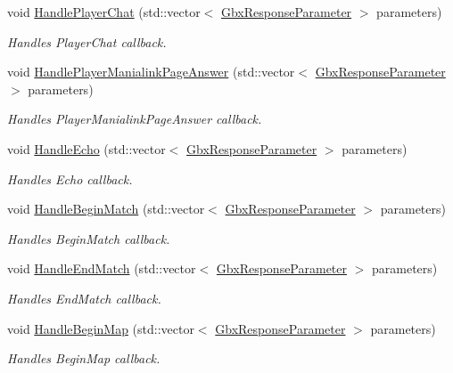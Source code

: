 \begin{DoxyCompactItemize}
void \hyperlink{classCallBackManager_a0919197cbeeb3c5a12230d44109a2cdb}{Handle\-Player\-Chat} (std\-::vector$<$ \hyperlink{classGbxResponseParameter}{Gbx\-Response\-Parameter} $>$ parameters)
\begin{DoxyCompactList}\small\item\em Handles Player\-Chat callback. \end{DoxyCompactList}\item 
void \hyperlink{classCallBackManager_af4fcbb46d5e88bfdf34185b1d0c7d836}{Handle\-Player\-Manialink\-Page\-Answer} (std\-::vector$<$ \hyperlink{classGbxResponseParameter}{Gbx\-Response\-Parameter} $>$ parameters)
\begin{DoxyCompactList}\small\item\em Handles Player\-Manialink\-Page\-Answer callback. \end{DoxyCompactList}\item 
void \hyperlink{classCallBackManager_a75f7f6d423799a89d9988b23a22bed18}{Handle\-Echo} (std\-::vector$<$ \hyperlink{classGbxResponseParameter}{Gbx\-Response\-Parameter} $>$ parameters)
\begin{DoxyCompactList}\small\item\em Handles Echo callback. \end{DoxyCompactList}\item 
void \hyperlink{classCallBackManager_ad741782611d10c7a67e6d1a8630cc605}{Handle\-Begin\-Match} (std\-::vector$<$ \hyperlink{classGbxResponseParameter}{Gbx\-Response\-Parameter} $>$ parameters)
\begin{DoxyCompactList}\small\item\em Handles Begin\-Match callback. \end{DoxyCompactList}\item 
void \hyperlink{classCallBackManager_a1084f327bacd054c1a8204e3f5e90ccb}{Handle\-End\-Match} (std\-::vector$<$ \hyperlink{classGbxResponseParameter}{Gbx\-Response\-Parameter} $>$ parameters)
\begin{DoxyCompactList}\small\item\em Handles End\-Match callback. \end{DoxyCompactList}\item 
void \hyperlink{classCallBackManager_a0a106f538862503a6c5b268a75d18e7a}{Handle\-Begin\-Map} (std\-::vector$<$ \hyperlink{classGbxResponseParameter}{Gbx\-Response\-Parameter} $>$ parameters)
\begin{DoxyCompactList}\small\item\em Handles Begin\-Map callback. \end{DoxyCompactList}\item 

\end{DoxyCompactItemize}
